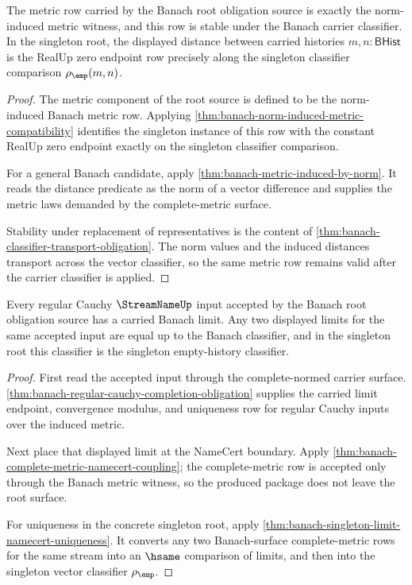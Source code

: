 \begin{theorem}
\label{thm:banach-root-norm-metric-obligation}
The metric row carried by the Banach root obligation source is exactly the
norm-induced metric witness, and this row is stable under the Banach carrier
classifier. In the singleton root, the displayed distance between carried
histories $m,n:\mathsf{BHist}$ is the RealUp zero endpoint row precisely along
the singleton classifier comparison $\rho_{\emp}(m,n)$.
\end{theorem}
\begin{proof}
The metric component of the root source is defined to be the norm-induced
Banach metric row. Applying
\autoref{thm:banach-norm-induced-metric-compatibility} identifies the
singleton instance of this row with the constant RealUp zero endpoint exactly
on the singleton classifier comparison.

For a general Banach candidate, apply
\autoref{thm:banach-metric-induced-by-norm}. It reads the distance predicate
as the norm of a vector difference and supplies the metric laws demanded by the
complete-metric surface.

Stability under replacement of representatives is the content of
\autoref{thm:banach-classifier-transport-obligation}. The norm values and the
induced distances transport across the vector classifier, so the same metric
row remains valid after the carrier classifier is applied.
\end{proof}

\begin{theorem}
\label{thm:banach-root-completion-obligation}
Every regular Cauchy $\StreamNameUp$ input accepted by the Banach root
obligation source has a carried Banach limit. Any two displayed limits for the
same accepted input are equal up to the Banach classifier, and in the singleton
root this classifier is the singleton empty-history classifier.
\end{theorem}
\begin{proof}
First read the accepted input through the complete-normed carrier surface.
\autoref{thm:banach-regular-cauchy-completion-obligation} supplies the
carried limit endpoint, convergence modulus, and uniqueness row for regular
Cauchy inputs over the induced metric.

Next place that displayed limit at the NameCert boundary. Apply
\autoref{thm:banach-complete-metric-namecert-coupling}; the complete-metric
row is accepted only through the Banach metric witness, so the produced package
does not leave the root surface.

For uniqueness in the concrete singleton root, apply
\autoref{thm:banach-singleton-limit-namecert-uniqueness}. It converts any two
Banach-surface complete-metric rows for the same stream into an $\hsame$
comparison of limits, and then into the singleton vector classifier
$\rho_{\emp}$.
\end{proof}


